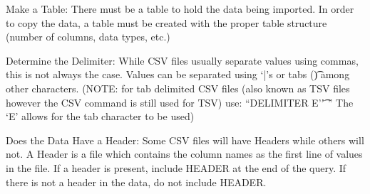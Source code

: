 Make a Table: There must be a table to hold the data being imported. In order to copy the data, a table must be created with the proper table structure (number of columns, data types, etc.)

Determine the Delimiter: While CSV files usually separate values using commas, this is not always the case. Values can be separated using ‘|’s or tabs (\t) among other characters. (NOTE: for tab delimited CSV files (also known as TSV files however the CSV command is still used for TSV) use: “DELIMITER E’\t’ ” The ‘E’ allows for the tab character to be used)

Does the Data Have a Header: Some CSV files will have Headers while others will not. A Header is a file which contains the column names as the first line of values in the file. If a header is present, include HEADER at the end of the query. If there is not a header in the data, do not include HEADER.

